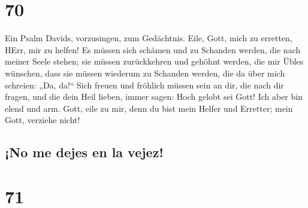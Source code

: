 \hypertarget{section-69}{%
\section{70}\label{section-69}}

 Ein Psalm Davids, vorzusingen, zum Gedächtnis.
 Eile, Gott, mich zu erretten, HErr, mir zu helfen!
 Es müssen sich schämen und zu Schanden werden, die nach
meiner Seele stehen; sie müssen zurückkehren und gehöhnt werden, die mir
Übles wünschen,  dass sie müssen wiederum zu Schanden
werden, die da über mich schreien: „Da, da!{}``  Sich
freuen und fröhlich müssen sein an dir, die nach dir fragen, und die
dein Heil lieben, immer sagen: Hoch gelobt sei Gott!  Ich
aber bin elend und arm. Gott, eile zu mir, denn du bist mein Helfer und
Erretter; mein Gott, verziehe nicht!

\hypertarget{no-me-dejes-en-la-vejez}{%
\subsection{¡No me dejes en la vejez!}\label{no-me-dejes-en-la-vejez}}

\hypertarget{section-70}{%
\section{71}\label{section-70}}

